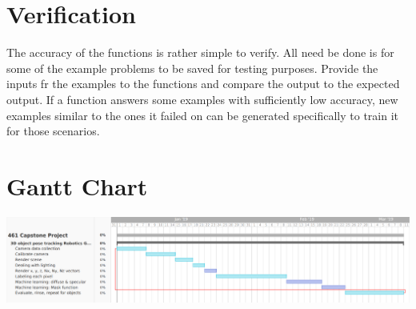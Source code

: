 \documentclass[10pt,journal,compsoc, draftclsnofoot,onecolumn]{IEEEtran}
\begin{document}
\section {Verification}
The accuracy of the functions is rather simple to verify. All need be done is for some of the example problems to be saved for testing purposes. Provide the inputs fr the examples to the functions and compare the output to the expected output. If a function answers some examples with sufficiently low accuracy, new examples similar to the ones it failed on can be generated specifically to train it for those scenarios.

  \section{Gantt Chart}
  \includegraphics[width=\textwidth]{gantt.PNG}
\end{document}
